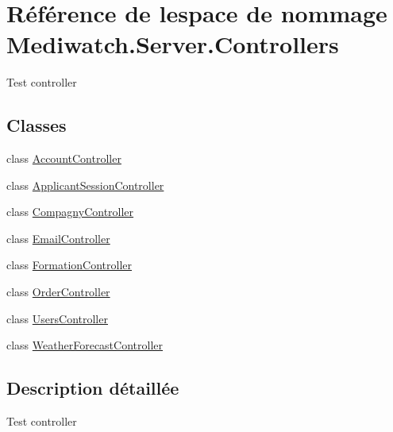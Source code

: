 \hypertarget{namespace_mediwatch_1_1_server_1_1_controllers}{}\section{Référence de l\textquotesingle{}espace de nommage Mediwatch.\+Server.\+Controllers}
\label{namespace_mediwatch_1_1_server_1_1_controllers}


Test controller  


\subsection*{Classes}
\begin{DoxyCompactItemize}
\item 
class \hyperlink{class_mediwatch_1_1_server_1_1_controllers_1_1_account_controller}{Account\+Controller}
\item 
class \hyperlink{class_mediwatch_1_1_server_1_1_controllers_1_1_applicant_session_controller}{Applicant\+Session\+Controller}
\item 
class \hyperlink{class_mediwatch_1_1_server_1_1_controllers_1_1_compagny_controller}{Compagny\+Controller}
\item 
class \hyperlink{class_mediwatch_1_1_server_1_1_controllers_1_1_email_controller}{Email\+Controller}
\item 
class \hyperlink{class_mediwatch_1_1_server_1_1_controllers_1_1_formation_controller}{Formation\+Controller}
\item 
class \hyperlink{class_mediwatch_1_1_server_1_1_controllers_1_1_order_controller}{Order\+Controller}
\item 
class \hyperlink{class_mediwatch_1_1_server_1_1_controllers_1_1_users_controller}{Users\+Controller}
\item 
class \hyperlink{class_mediwatch_1_1_server_1_1_controllers_1_1_weather_forecast_controller}{Weather\+Forecast\+Controller}
\end{DoxyCompactItemize}


\subsection{Description détaillée}
Test controller 

